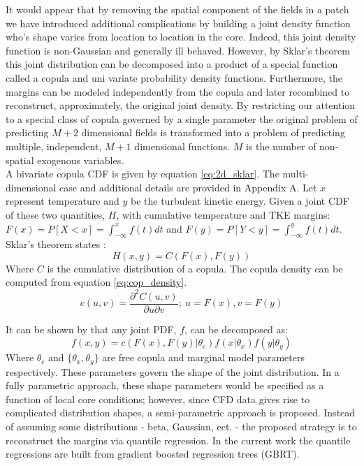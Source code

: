 It would appear that by removing the spatial component of the fields in a patch we have introduced additional complications by building a joint density function who's shape varies from location to location in the core.  Indeed, this joint density function is non-Gaussian and generally ill behaved.  However, by Sklar's theorem this joint distribution can be decomposed into a product of a special function called a copula and uni variate probability density functions.  Furthermore, the margins can be modeled independently from the copula and later recombined to reconstruct, approximately, the original joint density.  By restricting our attention to a special class of copula governed by a single parameter the original problem of predicting $M+2$ dimensional fields is transformed into a problem of predicting multiple, independent, $M+1$ dimensional functions.  $M$ is the number of non-spatial exogenous variables. \\

A bivariate copula CDF is given by equation \ref{eq:2d_sklar}.  The multi-dimensional case and additional details are provided in Appendix A.  Let $x$ represent temperature and $y$ be the turbulent kinetic energy.
Given a joint CDF of these two quantities, $H$, with cumulative temperature and TKE margins: $F(x)=P[X < x] = \int_{-\infty}^{x}f(t)dt$
and $F(y)=P[Y < y] = \int_{-\infty}^{y}f(t)dt$. Sklar's theorem states \cite{Nelsen2006}:
\begin{equation}
H(x,y) = C(F(x), F(y))
\label{eq:2d_sklar}
\end{equation}
Where $C$ is the cumulative distribution of a copula.  The copula density can be computed from equation \ref{eq:cop_density}.
\begin{equation}
c(u, v) = \frac{\partial^2 C(u, v)}{\partial u \partial v};\ u=F(x), v=F(y)
\label{eq:cop_density}
\end{equation}

It can be shown by that any joint PDF, $f$, can be decomposed as:
\begin{equation}
f(x, y) = c(F(x), F(y)|\theta_c)f(x|\theta_x)f(y|\theta_y)
\end{equation}
Where $\theta_c$ and $\{\theta_{x}, \theta_{y}\}$ are free copula and marginal model parameters respectively.
These parameters govern the shape of the joint distribution.  In a fully parametric approach, these shape parameters would be specified as a function of local core conditions; however, since CFD data gives rise to complicated distribution shapes, a semi-parametric approach is proposed.  Instead of assuming some distributions - beta, Gaussian, ect. - the proposed strategy is to reconstruct the margins via quantile regression.  In the current work the quantile regressions are built from gradient boosted regression trees (GBRT). 

